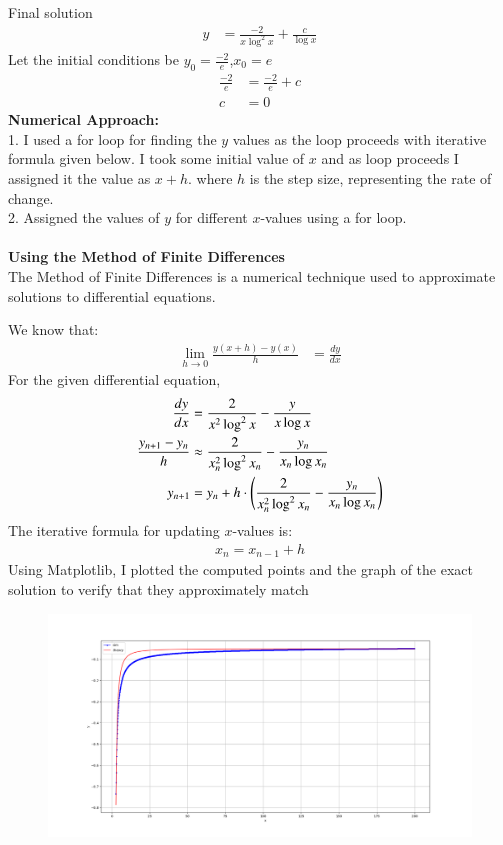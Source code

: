 \documentclass[journal]{IEEEtran}
\numberwithin{equation}{enumi}
\numberwithin{figure}{enumi}
\begin{document}
Final solution
\begin{align}
    y&=\frac{-2}{x\log^2{x}}+\frac{c}{\log{x}}
\end{align}
Let the initial conditions be $y_0=\frac{-2}{e}$,$x_0=e$
\begin{align}
    \frac{-2}{e}&=\frac{-2}{e}+c\\
    c&=0
\end{align}
\noindent\textbf{Numerical Approach:}\\1. I used a for loop for finding the $y$ values as the loop proceeds with iterative formula given below. I took some initial value of $x$ and as loop proceeds I assigned it the value as $x+h$. where $h$ is the step size, representing the rate of change. 
\\2. Assigned the values of $y$ for different $x$-values using a for loop. \\ 
\\ \textbf{Using the Method of Finite Differences}\\
The Method of Finite Differences is a numerical technique used to approximate solutions to differential equations. 

We know that:
\begin{align}
   \lim_{h \to 0} \frac{y(x+h) - y(x)}{h} &= \frac{dy}{dx} 
\end{align}
For the given differential equation,
\begin{align}
    \frac{dy}{dx}&=\frac{2}{x^2\log^2x}-\frac{y}{x\log{x}}\\
    \frac{y_{n+1} - y_n}{h}&\approx \frac{2}{x_n^2\log^2x_n}-\frac{y_n}{x_n\log{x_n}}\\
    y_{n+1} &= y_n + h \cdot \left(\frac{2}{x_n^2\log^2x_n}-\frac{y_n}{x_n\log{x_n}}\right)
\end{align}
The iterative formula for updating $x$-values is: 
\begin{align}
    x_n=x_{n-1}+h
\end{align}
Using Matplotlib, I plotted the computed points and the graph of the exact solution to verify that they approximately match
\begin{figure}[h!]
	\centering
	\includegraphics[width=\columnwidth]{figs/Figure_1.png}
	\label{stemplot}
\end{figure}	
\end{document}

